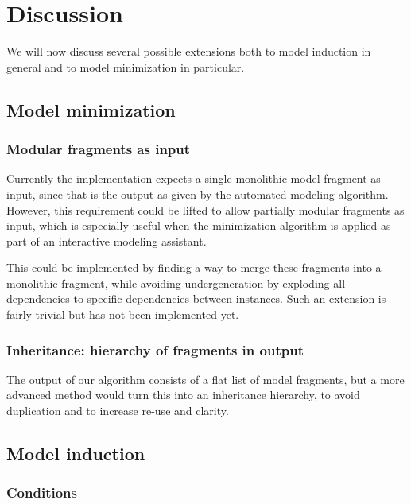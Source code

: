 \documentclass{article} %
\begin{document}

\section{Discussion}
\label{sec:discussion}
We will now discuss several possible extensions both to model induction in
general and to model minimization in particular.

\subsection{Model minimization}


\subsubsection{Modular fragments as input}

Currently the implementation expects a single monolithic model fragment as
input, since that is the output as given by the automated modeling algorithm.
However, this requirement could be lifted to allow partially modular fragments
as input, which is especially useful when the minimization algorithm is applied
as part of an interactive modeling assistant.

This could be implemented by finding a way to merge these fragments into a
monolithic fragment, while avoiding undergeneration by exploding all
dependencies to specific dependencies between instances. Such an extension is
fairly trivial but has not been implemented yet.

\subsubsection{Inheritance: hierarchy of fragments in output}

The output of our algorithm consists of a flat list of model fragments, but a
more advanced method would turn this into an inheritance hierarchy, to avoid
duplication and to increase re-use and clarity.

\subsection{Model induction}

\subsubsection{Conditions}
\end{document}
